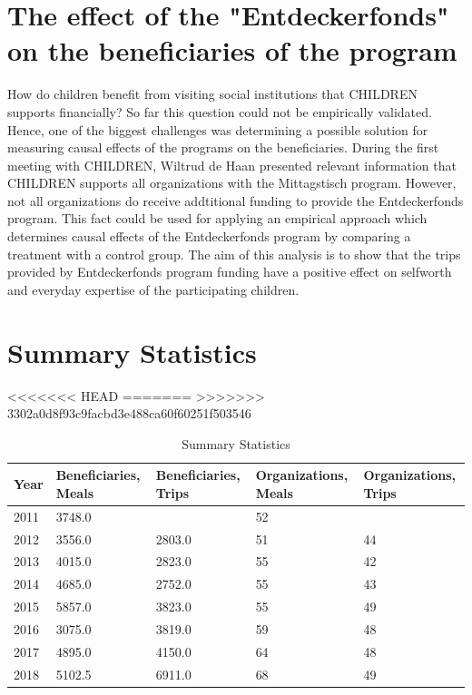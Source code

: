 \documentclass[12pt, a4paper, titlepage]{article}\usepackage[]{graphicx}\usepackage[]{color}
\begin{document}
\section{The effect of the "Entdeckerfonds" on the beneficiaries of the program}

How do children benefit from visiting social institutions that CHILDREN supports financially? So far this question could not be empirically validated. Hence, one of the biggest challenges was determining a possible solution for measuring causal effects of the programs on the beneficiaries. During the first meeting with CHILDREN, Wiltrud de Haan presented relevant information that CHILDREN supports all organizations with the Mittagstisch program. However, not all organizations do receive addtitional funding to provide the Entdeckerfonds program. This fact could be used for applying an empirical approach which determines causal effects of the Entdeckerfonds program by comparing a treatment with a control group. The aim of this analysis is to show that the trips provided by Entdeckerfonds program funding have a positive effect on selfworth and everyday expertise of the participating children. 



\section{Summary Statistics}

<<<<<<< HEAD
=======
>>>>>>> 3302a0d8f93c9facbd3e488ca60f60251f503546
\begin{table}[ht]
\centering
\begin{tabular}{mmmmm}
  \hline
Year & Beneficiaries, Meals & Beneficiaries, Trips & Organizations, Meals & Organizations, Trips \\ 
  \hline
2011 & 3748.0 &  & 52 &  \\ 
  2012 & 3556.0 & 2803.0 & 51 & 44 \\ 
  2013 & 4015.0 & 2823.0 & 55 & 42 \\ 
  2014 & 4685.0 & 2752.0 & 55 & 43 \\ 
  2015 & 5857.0 & 3823.0 & 55 & 49 \\ 
  2016 & 3075.0 & 3819.0 & 59 & 48 \\ 
  2017 & 4895.0 & 4150.0 & 64 & 48 \\ 
  2018 & 5102.5 & 6911.0 & 68 & 49 \\ 
   \hline
\end{tabular}
\caption{Summary Statistics} 
\end{table}
\end{document}

